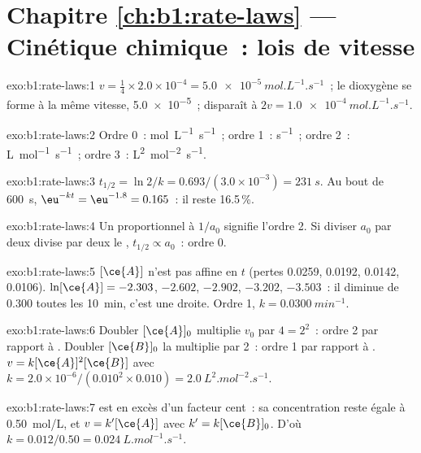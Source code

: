 \section*{Chapitre \ref{ch:b1:rate-laws} --- Cinétique chimique~: lois de vitesse}

\begin{solution}{exo:b1:rate-laws:1}
$v = \frac14 \times 2.0 \times 10^{-4} = \qty{5.0e-5}{mol.L^{-1}.s^{-1}}$~;
le dioxygène se forme à la même vitesse, \qty{5.0e-5}{}~; 
disparaît à $2v = \qty{1.0e-4}{mol.L^{-1}.s^{-1}}$.
\end{solution}

\begin{solution}{exo:b1:rate-laws:2}
Ordre 0~: \unit{mol.L^{-1}.s^{-1}}~; ordre 1~: \unit{s^{-1}}~; ordre 2~:
\unit{L.mol^{-1}.s^{-1}}~; ordre 3~: \unit{L^2.mol^{-2}.s^{-1}}.
\end{solution}

\begin{solution}{exo:b1:rate-laws:3}
$t_{1/2} = \ln2/k = 0.693/(3.0 \times 10^{-3}) = \qty{231}{s}$. Au bout
de \qty{600}{s}, $\eu^{-kt} = \eu^{-1.8} = 0.165$~: il reste 16.5\,\%.
\end{solution}

\begin{solution}{exo:b1:rate-laws:4}
Un  proportionnel à $1/a_0$ signifie l'ordre 2. Si
diviser $a_0$ par deux divise par deux le ,
$t_{1/2} \propto a_0$~: ordre 0.
\end{solution}

\begin{solution}{exo:b1:rate-laws:5}
$[\ce{A}]$ n'est pas affine en $t$ (pertes 0.0259, 0.0192, 0.0142,
0.0106). $\ln[\ce{A}] = -2.303$, $-2.602$, $-2.902$, $-3.202$, $-3.503$~:
il diminue de 0.300 toutes les \qty{10}{min}, c'est une droite. Ordre 1,
$k =
\qty{0.0300}{min^{-1}}$.
\end{solution}

\begin{solution}{exo:b1:rate-laws:6}
Doubler $[\ce{A}]_0$ multiplie $v_0$ par $4 = 2^2$~: ordre 2 par rapport
à . Doubler $[\ce{B}]_0$ la multiplie par 2~: ordre 1 par rapport
à . $v =
k[\ce{A}]^2[\ce{B}]$ avec $k = 2.0 \times 10^{-6}/(0.010^2 \times 0.010) =
\qty{2.0}{L^2.mol^{-2}.s^{-1}}$.
\end{solution}

\begin{solution}{exo:b1:rate-laws:7}
 est en excès d'un facteur cent~: sa concentration reste égale à
\qty{0.50}{mol/L}, et $v = k'[\ce{A}]$ avec $k' = k[\ce{B}]_0$. D'où
$k = 0.012/0.50 = \qty{0.024}{L.mol^{-1}.s^{-1}}$.
\end{solution}

